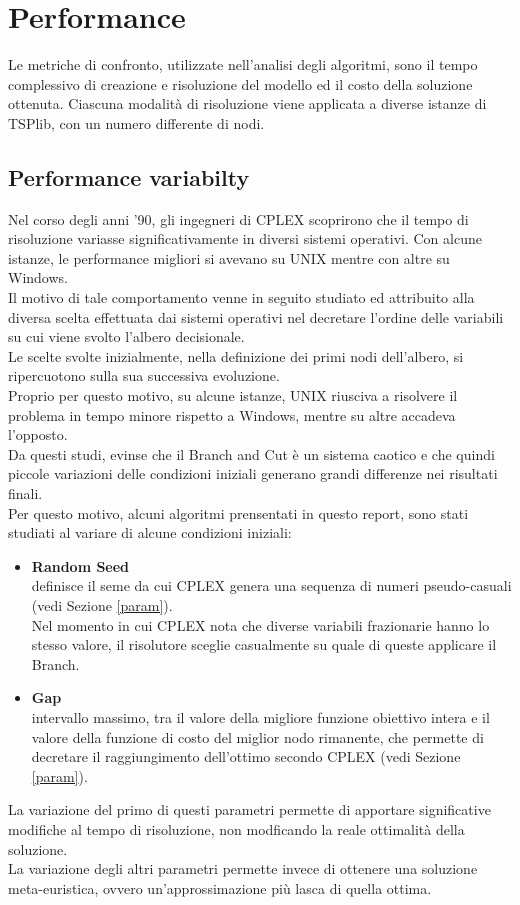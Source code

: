 \chapter{Performance}\label{PERF_PROF}
Le metriche di confronto, utilizzate nell'analisi degli algoritmi, sono il tempo complessivo di creazione e risoluzione del modello ed il costo della soluzione ottenuta. Ciascuna modalità di risoluzione viene applicata a diverse istanze di TSPlib, con un numero differente di nodi.  
\section{Performance variabilty}
Nel corso degli anni '90, gli ingegneri di CPLEX scoprirono che il tempo di risoluzione variasse significativamente in diversi sistemi operativi. Con alcune istanze, le performance migliori si avevano su UNIX mentre con altre su Windows.\\
Il motivo di tale comportamento venne in seguito studiato ed attribuito alla diversa scelta effettuata dai sistemi operativi nel decretare l'ordine delle variabili su cui viene svolto l'albero decisionale.\\
Le scelte svolte inizialmente, nella definizione dei primi nodi dell'albero, si ripercuotono sulla sua successiva evoluzione.\\
Proprio per questo motivo, su alcune istanze, UNIX riusciva a risolvere il problema in tempo minore rispetto a Windows, mentre su altre accadeva l'opposto.\\
Da questi studi, evinse che il Branch and Cut è un sistema caotico e che quindi piccole variazioni delle condizioni iniziali generano grandi differenze nei risultati finali.\\
Per questo motivo, alcuni algoritmi prensentati in questo report, sono stati studiati al variare di alcune condizioni iniziali:
\begin{itemize}
\item{\textbf{Random Seed}\\
definisce il seme da cui CPLEX genera una sequenza di numeri pseudo-casuali (vedi Sezione \ref{param}).\\
Nel momento in cui CPLEX nota che diverse variabili frazionarie hanno lo stesso valore, il risolutore sceglie casualmente su quale di queste applicare il Branch.}
\item{\textbf{Gap}\\
intervallo massimo, tra il valore della migliore funzione obiettivo intera e il valore della funzione di costo del miglior nodo rimanente, che permette di decretare il raggiungimento dell'ottimo secondo CPLEX (vedi Sezione \ref{param}).}
\end{itemize}
La variazione del primo di questi parametri permette di apportare significative modifiche al tempo di risoluzione, non modficando la reale ottimalità della soluzione.\\
La variazione degli altri parametri permette invece di ottenere una soluzione meta-euristica, ovvero un'approssimazione più lasca di quella ottima.
 
